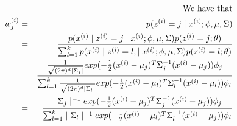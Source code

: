 \begin{answer}

\begin{eqnarray*}
&&\hspace*{-63pt}\text{We have that} \\
w_j^{(i)} &=& p(z^{(i)} = j\mid x^{(i)} ; \phi, \mu, \Sigma)  \\
&=& \frac{p(x^{(i)} \mid z^{(i)} = j\mid x^{(i)} ; \phi, \mu, \Sigma) p(z^{(i)} = j; \theta)} {\sum_{l=1}^k p(x^{(i)} \mid z^{(i)} = l ;\mid x^{(i)} ; \phi, \mu, \Sigma) p(z^{(i)}  = l ; \theta)} \\
&=& \frac{ \frac{1} {\sqrt{(2\pi)^d\mid\Sigma_j\mid}} exp ( - \frac{1} {2} (x^{(i)} - \mu_j)^T \Sigma_j^{-1} (x^{(i)} -\mu_j))\phi_j } {\sum_{l=1}^k \frac{1} {\sqrt{(2\pi)^d\mid\Sigma_l\mid}} exp ( - \frac{1} {2} (x^{(i)} - \mu_l)^T \Sigma_l^{-1} (x^{(i)} -\mu_l))\phi_l} \\
&=& \frac{\mid\Sigma_j\mid^{-1} exp ( - \frac{1} {2} (x^{(i)} - \mu_j)^T \Sigma_j^{-1} (x^{(i)} -\mu_j))\phi_j } {\sum_{l=1}^k\mid\Sigma_l\mid^{-1} exp ( - \frac{1} {2} (x^{(i)} - \mu_l)^T \Sigma_l^{-1} (x^{(i)} -\mu_j))\phi_l }
\end{eqnarray*}

\end{answer}
